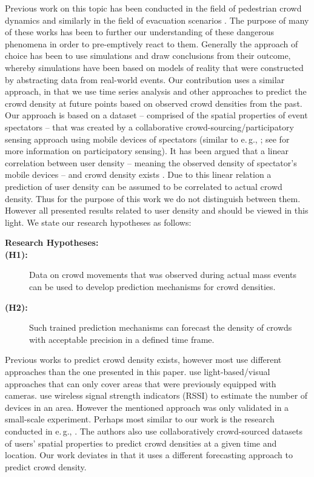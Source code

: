 \documentclass[12pt,a4paper,twoside,openright]{book}
\begin{document}
Previous work on this topic has been conducted in the field of pedestrian crowd dynamics \cite{Helbing2005,Burstedde2001,Antonini2006} and similarly in the field of evacuation scenarios \cite{helbing2009,klingsch2010,zia2011}.
%
The purpose of many of these works has been to further our understanding of these dangerous phenomena in order to pre-emptively react to them.
%
Generally the approach of choice has been to use simulations and draw conclusions from their outcome, whereby simulations have been based on models of reality that were constructed by abstracting data from real-world events.
%
Our contribution uses a similar approach, in that we use time series analysis and other approaches to predict the crowd density at future points based on observed crowd densities from the past.
%
Our approach is based on a dataset -- comprised of the spatial properties of event spectators -- that was created by a collaborative crowd-sourcing/participatory sensing approach using mobile devices of spectators (similar to e.\,g., \cite{wirz2012}; see \cite{Burke2006} for more information on participatory sensing).
%
It has been argued that a linear correlation between user density -- meaning the observed density of spectator's mobile devices -- and crowd density exists \cite{wirz2013}.
%
Due to this linear relation a prediction of user density can be assumed to be correlated to actual crowd density.
%
Thus for the purpose of this work we do not distinguish between them.
%
However all presented results related to user density and should be viewed in this light.
%
We state our research hypotheses as follows:

\begin{description}
\item[\textbf{Research Hypotheses:}]
\item[\textbf{(H1):}] Data on crowd movements that was observed during actual mass events can be used to develop prediction mechanisms for crowd densities.
\item[\textbf{(H2):}] Such trained prediction mechanisms can forecast the density of crowds with acceptable precision in a defined time frame.
\end{description}

Previous works to predict crowd density exists, however most use different approaches than the one presented in this paper.
%
\cite{hsu2011,ma2004} use light-based/visual approaches that can only cover areas that were previously equipped with cameras.
%
\cite{Nakatsuka2008} use wireless signal strength indicators (RSSI) to estimate the number of devices in an area.
%
However the mentioned approach was only validated in a small-scale experiment.
%
Perhaps most similar to our work is the research conducted in e.\,g., \cite{wirz2013,weppner2013}.
%
The authors also use collaboratively crowd-sourced datasets of users' spatial properties to predict crowd densities at a given time and location.
%
Our work deviates in that it uses a different forecasting approach to predict crowd density.
\end{document}
